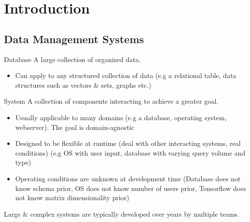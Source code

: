 \chapter{Introduction}
\section{Data Management Systems}
\begin{definitionbox}{Database}
    A large collection of organized data.
    \begin{itemize}
        \item Can apply to any structured collection of data (e.g a relational table, data structures such as vectors \& sets, graphs etc.)
    \end{itemize}
\end{definitionbox}

\begin{definitionbox}{System}
    A collection of components interacting to achieve a greater goal.
    \begin{itemize}
        \item Usually applicable to many domains (e.g a database, operating system, webserver). The goal is domain-agnostic
        \item Designed to be flexible at runtime (deal with other interacting systems, real conditions) (e.g OS with user input, database with varying query volume and type)
        \item Operating conditions are unknown at development time (Database does not know schema prior, OS does not know number of users prior, Tensorflow does not know matrix dimensionality prior)
    \end{itemize}
    Large \& complex systems are typically developed over years by multiple teams.
\end{definitionbox}

